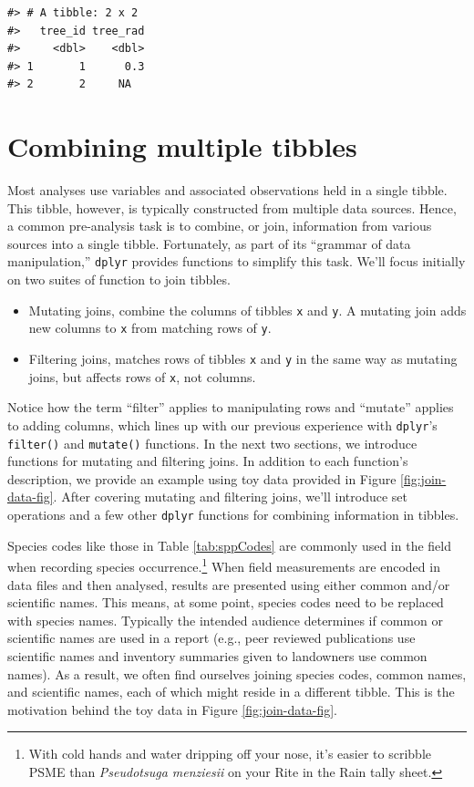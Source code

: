 \documentclass[
  11pt,
]{krantz}
\theoremstyle{definition}
\theoremstyle{definition}
\theoremstyle{definition}
\theoremstyle{definition}
\theoremstyle{remark}
\begin{document}
\begin{verbatim}
#> # A tibble: 2 x 2
#>   tree_id tree_rad
#>     <dbl>    <dbl>
#> 1       1      0.3
#> 2       2     NA
\end{verbatim}

\hypertarget{twoTables}{%
\section{Combining multiple tibbles}\label{twoTables}}

Most analyses use variables and associated observations held in a single tibble. This tibble, however, is typically constructed from multiple data sources. Hence, a common pre-analysis task is to combine, or join, information from various sources into a single tibble. Fortunately, as part of its ``grammar of data manipulation,'' \texttt{dplyr} provides functions to simplify this task. We'll focus initially on two suites of function to join tibbles.

\begin{itemize}
\item
  Mutating joins, combine the columns of tibbles \texttt{x} and \texttt{y}. A mutating join adds new columns to \texttt{x} from matching rows of \texttt{y}.
\item
  Filtering joins, matches rows of tibbles \texttt{x} and \texttt{y} in the same way as mutating joins, but affects rows of \texttt{x}, not columns.
\end{itemize}

Notice how the term ``filter'' applies to manipulating rows and ``mutate'' applies to adding columns, which lines up with our previous experience with \texttt{dplyr}'s \texttt{filter()} and \texttt{mutate()} functions. In the next two sections, we introduce functions for mutating and filtering joins. In addition to each function's description, we provide an example using toy data provided in Figure \ref{fig:join-data-fig}. After covering mutating and filtering joins, we'll introduce set operations and a few other \texttt{dplyr} functions for combining information in tibbles.

Species codes like those in Table \ref{tab:sppCodes} are commonly used in the field when recording species occurrence.\footnote{With cold hands and water dripping off your nose, it's easier to scribble PSME than \emph{Pseudotsuga menziesii} on your Rite in the Rain tally sheet.} When field measurements are encoded in data files and then analysed, results are presented using either common and/or scientific names. This means, at some point, species codes need to be replaced with species names. Typically the intended audience determines if common or scientific names are used in a report (e.g., peer reviewed publications use scientific names and inventory summaries given to landowners use common names). As a result, we often find ourselves joining species codes, common names, and scientific names, each of which might reside in a different tibble. This is the motivation behind the toy data in Figure \ref{fig:join-data-fig}.
\end{document}
